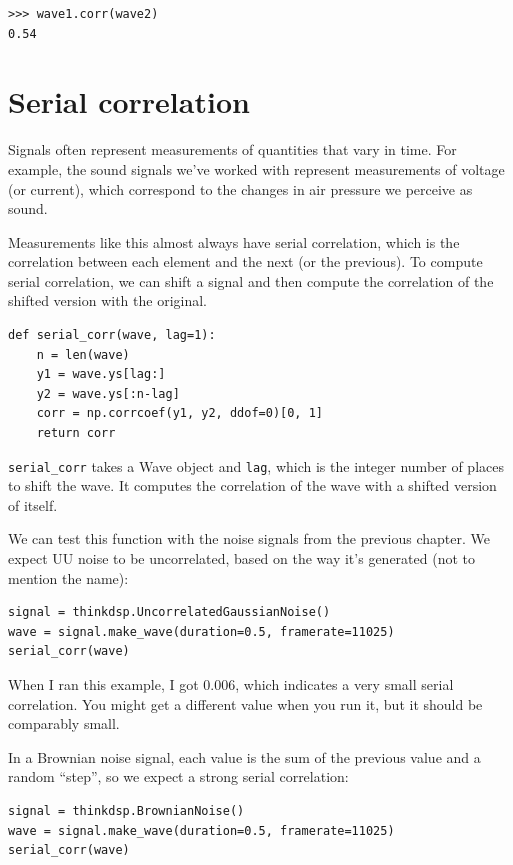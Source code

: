 \documentclass[12pt]{book}
\begin{document}
\begin{verbatim}
>>> wave1.corr(wave2)
0.54
\end{verbatim}


\section{Serial correlation}

Signals often represent measurements of quantities that vary in
time.  For example, the sound signals we've worked with represent
measurements of voltage (or current), which correspond to the changes
in air pressure we perceive as sound.

Measurements like this almost always have serial correlation, which
is the correlation between each element and the next (or the previous).
To compute serial correlation, we can shift a signal and then compute
the correlation of the shifted version with the original.

\begin{verbatim}
def serial_corr(wave, lag=1):
    n = len(wave)
    y1 = wave.ys[lag:]
    y2 = wave.ys[:n-lag]
    corr = np.corrcoef(y1, y2, ddof=0)[0, 1]
    return corr
\end{verbatim}

\verb"serial_corr" takes a Wave object and
{\tt lag}, which is the integer number of places to shift the wave.
It computes the correlation of the wave with a shifted version
of itself.

We can test this function with the noise signals from the previous
chapter.  We expect UU noise to be uncorrelated, based on the
way it's generated (not to mention the name):

\begin{verbatim}
signal = thinkdsp.UncorrelatedGaussianNoise()
wave = signal.make_wave(duration=0.5, framerate=11025)
serial_corr(wave)
\end{verbatim}

When I ran this example, I got 0.006, which indicates a very
small serial correlation.  You might get a different value when you run
it, but it should be comparably small.

In a Brownian noise signal, each value is the sum of the previous
value and a random ``step'', so we expect a strong serial
correlation:

\begin{verbatim}
signal = thinkdsp.BrownianNoise()
wave = signal.make_wave(duration=0.5, framerate=11025)
serial_corr(wave)
\end{verbatim}
\end{document}
